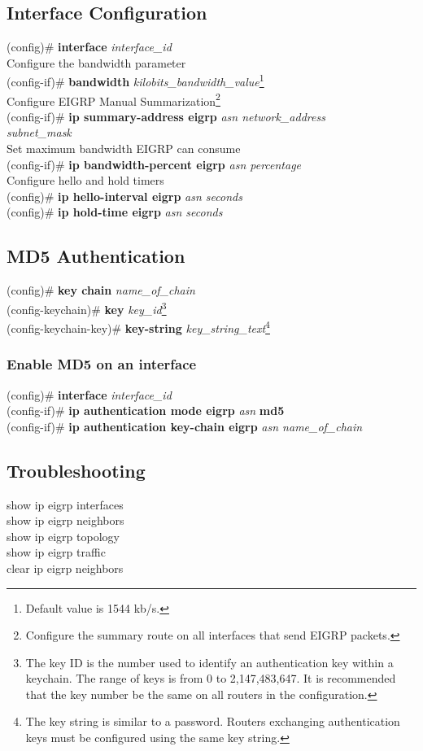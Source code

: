 \subsection{Interface Configuration}
(config)\# \textbf{interface} \textit{interface\_id}\vspace{11pt}\\
\textrm{Configure the bandwidth parameter}\\
(config-if)\# \textbf{bandwidth} \textit{kilobits\_bandwidth\_value}\footnote{Default value is 1544 kb/s.}\vspace{11pt}\\
\textrm{Configure EIGRP Manual Summarization}\footnote{Configure the summary route on all interfaces that send EIGRP packets.}\\
(config-if)\# \textbf{ip summary-address eigrp} \textit{asn network\_address \\subnet\_mask}\vspace{11pt}\\
\textrm{Set maximum bandwidth EIGRP can consume}\\
(config-if)\# \textbf{ip bandwidth-percent eigrp} \textit{asn percentage}\vspace{11pt}\\
\textrm{Configure hello and hold timers}\\
(config)\# \textbf{ip hello-interval eigrp} \textit{asn seconds}\\
(config)\# \textbf{ip hold-time eigrp} \textit{asn seconds}
\subsection{MD5 Authentication}
(config)\# \textbf{key chain} \textit{name\_of\_chain}\\
(config-keychain)\# \textbf{key} \textit{key\_id}\footnote{ The key ID is the number used to identify an authentication key within a keychain. The range of keys is from 0 to 2,147,483,647. It is recommended that the key number be the same on all routers in the configuration.}\\
(config-keychain-key)\# \textbf{key-string} \textit{key\_string\_text}\footnote{The key string is similar to a password. Routers exchanging authentication keys must be configured using the same key string.}
\subsubsection*{Enable MD5 on an interface}
(config)\# \textbf{interface} \textit{interface\_id}\\
(config-if)\# \textbf{ip authentication mode eigrp} \textit{asn} \textbf{md5}\\
(config-if)\# \textbf{ip authentication key-chain eigrp} \textit{asn name\_of\_chain}
\subsection{Troubleshooting}
show ip eigrp interfaces\\
show ip eigrp neighbors\\
show ip eigrp topology\\
show ip eigrp traffic\\
clear ip eigrp neighbors